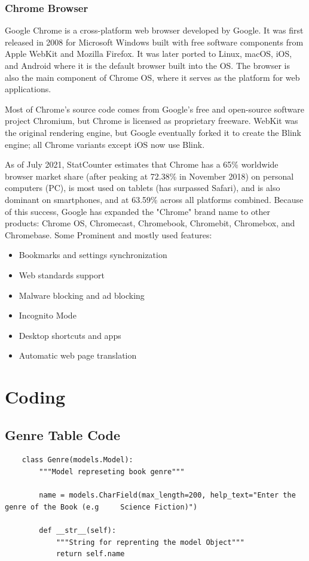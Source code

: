 \documentclass[12pt, a4paper]{report}
\begin{document}
\newpage
\subsubsection{Chrome Browser}

Google Chrome is a cross-platform web browser developed by Google. It was first released in 2008 for Microsoft Windows built with free software components from Apple WebKit and Mozilla Firefox. It was later ported to Linux, macOS, iOS, and Android where it is the default browser built into the OS. The browser is also the main component of Chrome OS, where it serves as the platform for web applications.

Most of Chrome's source code comes from Google's free and open-source software project Chromium, but Chrome is licensed as proprietary freeware. WebKit was the original rendering engine, but Google eventually forked it to create the Blink engine; all Chrome variants except iOS now use Blink.

As of July 2021, StatCounter estimates that Chrome has a 65\% worldwide browser market share (after peaking at 72.38\% in November 2018) on personal computers (PC), is most used on tablets (has surpassed Safari), and is also dominant on smartphones, and at 63.59\% across all platforms combined. Because of this success, Google has expanded the "Chrome" brand name to other products: Chrome OS, Chromecast, Chromebook, Chromebit, Chromebox, and Chromebase.
Some Prominent and mostly used features:
\begin{itemize}
	\item Bookmarks and settings synchronization
	\item Web standards support
	\item Malware blocking and ad blocking
	\item Incognito Mode
	\item Desktop shortcuts and apps
	\item Automatic web page translation
\end{itemize}

\newpage
\section{Coding}

\subsection{Genre Table Code}
\begin{lstlisting}
	class Genre(models.Model):
		"""Model represeting book genre"""
	
		name = models.CharField(max_length=200, help_text="Enter the genre of the Book (e.g 	Science Fiction)")
	
		def __str__(self):
			"""String for reprenting the model Object"""
			return self.name

\end{lstlisting}
\newpage
\end{document}
